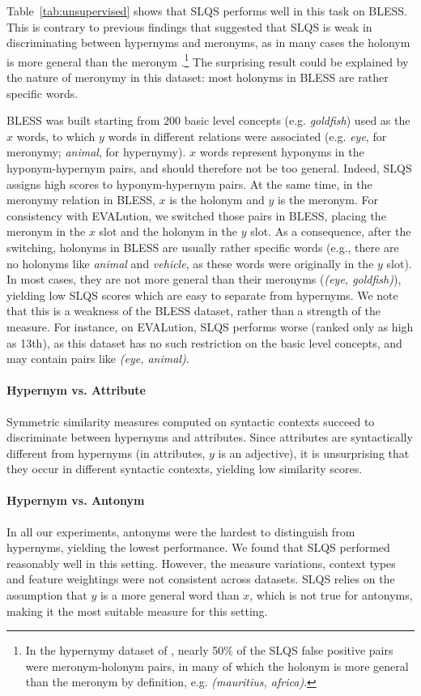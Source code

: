 \documentclass[11pt]{article}
\begin{document}
Table~\ref{tab:unsupervised} shows that SLQS performs well in this task on BLESS. This is contrary to previous findings that suggested that SLQS is weak in discriminating between hypernyms and meronyms, as in many cases the holonym is more general than the meronym \cite{shwartz2016improving}.\footnote{In the hypernymy dataset of , nearly 50\% of the SLQS false positive pairs were meronym-holonym pairs, in many of which the holonym is more general than the meronym by definition, e.g. \emph{(mauritius, africa)}.
} The surprising result could be explained by the nature of meronymy in this dataset: most holonyms in BLESS are rather specific words. 

BLESS was built starting from 200 basic level concepts (e.g. \emph{goldfish}) used as the $x$ words, to which $y$ words in different relations were associated (e.g. \emph{eye}, for meronymy; \emph{animal}, for hypernymy). $x$ words represent hyponyms in the hyponym-hypernym pairs, and should therefore not be too general. Indeed, SLQS assigns high scores to hyponym-hypernym pairs. At the same time, in the meronymy relation in BLESS, $x$ is the holonym and $y$ is the meronym. For consistency with EVALution, we switched those pairs in BLESS, placing the meronym in the $x$ slot and the holonym in the $y$ slot. As a consequence, after the switching, holonyms in BLESS are usually rather specific words (e.g., there are no holonyms like \emph{animal} and \emph{vehicle}, as these words were originally in the $y$ slot). In most cases, they are not more general than their meronyms (\emph{(eye, goldfish)}), yielding low SLQS scores which are easy to separate from hypernyms. We note that this is a weakness of the BLESS dataset, rather than a strength of the measure. For instance, on EVALution, SLQS performs worse (ranked only as high as 13th), as this dataset has no such restriction on the basic level concepts, and may contain pairs like \emph{(eye, animal)}.

\paragraph{Hypernym vs. Attribute} Symmetric similarity measures computed on syntactic contexts succeed to discriminate between hypernyms and attributes. Since attributes are syntactically different from hypernyms (in attributes, $y$ is an adjective), it is unsurprising that they occur in different syntactic contexts, yielding low similarity scores.

\paragraph{Hypernym vs. Antonym} In all our experiments, antonyms were the hardest to distinguish from hypernyms, yielding the lowest performance. We found that SLQS performed reasonably well in this setting. However, the measure variations, context types and feature weightings were not consistent across datasets. SLQS relies on the assumption that $y$ is a more general word than $x$, which is not true for antonyms, making it the most suitable measure for this setting.
\end{document}
